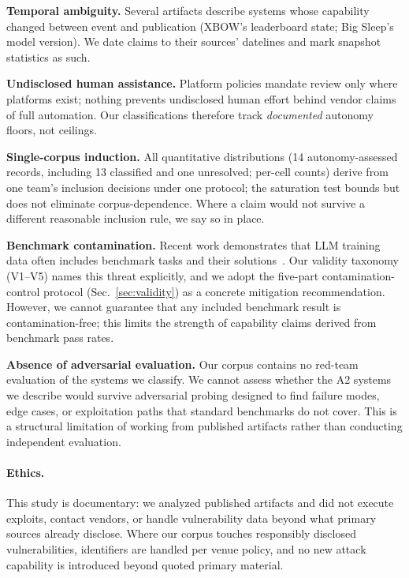 \documentclass[conference,compsoc]{IEEEtran}
\begin{document}
\textbf{Temporal ambiguity.} Several artifacts describe systems whose capability changed
between event and publication (XBOW's leaderboard state; Big Sleep's model version). We date
claims to their sources' datelines and mark snapshot statistics as such.

\textbf{Undisclosed human assistance.} Platform policies mandate review only where platforms
exist; nothing prevents undisclosed human effort behind vendor claims of full automation. Our
classifications therefore track \emph{documented} autonomy floors, not ceilings.

\textbf{Single-corpus induction.} All quantitative distributions (14 autonomy-assessed records,
including 13 classified and one unresolved; per-cell counts) derive from one team's inclusion decisions under one protocol; the saturation
test bounds but does not eliminate corpus-dependence. Where a claim would not survive a
different reasonable inclusion rule, we say so in place.

\textbf{Benchmark contamination.} Recent work demonstrates that LLM training data often includes
benchmark tasks and their solutions~\cite{primevul2024,cvebench2025}. Our validity taxonomy
(V1--V5) names this threat explicitly, and we adopt the five-part contamination-control protocol
(Sec.~\ref{sec:validity}) as a concrete mitigation recommendation. However, we cannot guarantee
that any included benchmark result is contamination-free; this limits the strength of capability
claims derived from benchmark pass rates.

\textbf{Absence of adversarial evaluation.} Our corpus contains no red-team evaluation of the
systems we classify. We cannot assess whether the A2 systems we describe would survive
adversarial probing designed to find failure modes, edge cases, or exploitation paths that
standard benchmarks do not cover. This is a structural limitation of working from published
artifacts rather than conducting independent evaluation.

\paragraph{Ethics.} This study is documentary: we analyzed published artifacts and did not
execute exploits, contact vendors, or handle vulnerability data beyond what primary sources
already disclose. Where our corpus touches responsibly disclosed vulnerabilities, identifiers
are handled per venue policy, and no new attack capability is introduced beyond quoted
primary material.
\end{document}
